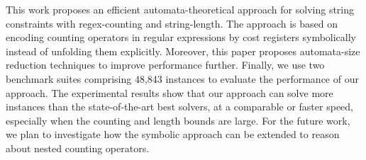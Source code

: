 %

This work proposes an efficient automata-theoretical approach for solving string constraints with regex-counting and string-length. The approach is based on encoding counting operators in regular expressions by cost registers symbolically instead of unfolding them explicitly. Moreover, this paper proposes automata-size reduction techniques to improve performance further. Finally, we use two benchmark suites comprising 48,843 instances to evaluate the performance of our approach. The experimental results show that our approach can solve more instances than the state-of-the-art best solvers, at a comparable or faster speed, especially when the counting and length bounds are large. 
For the future work, we plan to investigate how the symbolic approach can be extended to reason about nested counting operators. 




%